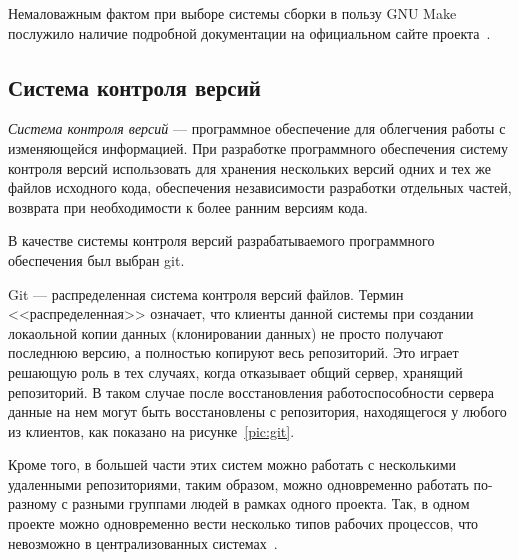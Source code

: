 Немаловажным фактом при выборе системы сборки в пользу GNU Make 
послужило наличие подробной документации на официальном сайте 
проекта~\cite{doc_make}.

\subsection{Система контроля версий}

\textit{Система контроля версий} --- программное обеспечение 
для облегчения работы с изменяющейся информацией.
При разработке программного обеспечения систему контроля версий использовать
для хранения нескольких версий одних и тех же файлов исходного кода,
обеспечения независимости разработки отдельных частей,
возврата при необходимости к более ранним версиям кода.

В качестве системы контроля версий разрабатываемого программного обеспечения
был выбран git.

Git --- распределенная система контроля версий файлов.
Термин <<распределенная>> означает, что клиенты данной системы при
создании локаольной копии данных (клонировании данных) не просто 
получают последнюю версию,
а полностью копируют весь репозиторий.
Это играет решающую роль в тех случаях, когда отказывает 
общий сервер, хранящий репозиторий. 
В таком случае после восстановления работоспособности сервера данные
на нем могут быть восстановлены с репозитория,
находящегося у любого из клиентов, как показано на рисунке~\ref{pic:git}.

Кроме того, в большей части этих систем можно работать с несколькими
удаленными репозиториями, таким образом, можно одновременно работать по-разному
с разными группами людей в рамках одного проекта.
Так, в одном проекте можно одновременно вести несколько типов рабочих процессов,
что невозможно в централизованных системах~\cite{doc_scm}.

\newpage

